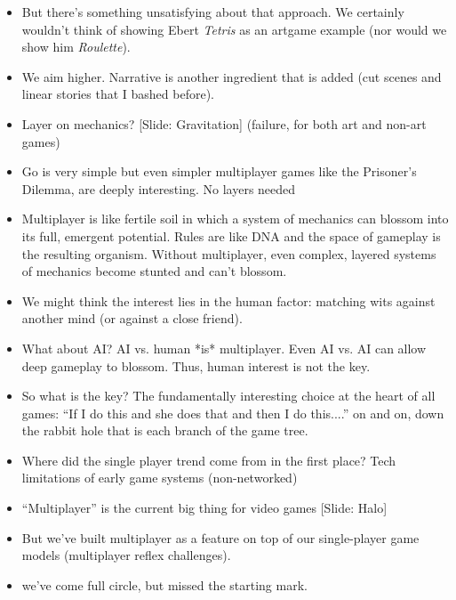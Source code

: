 \documentclass[12pt]{article}
\begin{document}
{\begin{itemize}
\item But there's something unsatisfying about that approach.  We certainly wouldn't think of showing Ebert {\it Tetris} as an artgame example (nor would we show him {\it Roulette}).

\item We aim higher.  Narrative is another ingredient that is added (cut scenes and linear stories that I bashed before).

\item Layer on mechanics? [Slide: Gravitation] (failure, for both art and non-art games)

\item Go is very simple but even simpler multiplayer games like the Prisoner's Dilemma, are deeply interesting.  No layers needed

\item Multiplayer is like fertile soil in which a system of mechanics can blossom into its full, emergent potential.  Rules are like DNA and the space of gameplay is the resulting organism.  Without multiplayer, even complex, layered systems of mechanics become stunted and can't blossom.


\item We might think the interest lies in the human factor:  matching wits against another mind (or against a close friend).

\newpage

\item What about AI?  AI vs. human *is* multiplayer.  Even AI vs. AI can allow deep gameplay to blossom.  Thus, human interest is not the key.

\item So what is the key?  The fundamentally interesting choice at the heart of all games:  ``If I do this and she does that and then I do this....'' on and on, down the rabbit hole that is each branch of the game tree. 

\item Where did the single player trend come from in the first place?  Tech limitations of early game systems (non-networked)

\item ``Multiplayer'' is the current big thing for video games [Slide: Halo]

\item But we've built multiplayer as a feature on top of our single-player game models (multiplayer reflex challenges).

\item we've come full circle, but missed the starting mark.


\end{itemize}}
\end{document}
